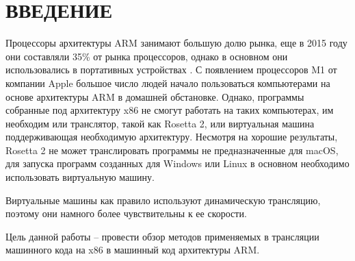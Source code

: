 \section*{ВВЕДЕНИЕ}

Процессоры архитектуры ARM занимают большую долю рынка, еще в 2015 году они составляли 35\% от рынка процессоров, однако в основном они использовались в портативных устройствах \cite{arm_report}.  С появлением процессоров M1 от компании Apple большое число людей начало пользоваться компьютерами на основе архитектуры ARM в домашней обстановке. Однако, программы собранные под архитектуру x86 не смогут работать на таких компьютерах, им необходим или транслятор, такой как Rosetta 2, или виртуальная машина поддерживающая необходимую архитектуру. Несмотря на хорошие результаты, Rosetta 2 не может транслировать программы не предназначенные для macOS, для запуска программ созданных для Windows или Linux в основном необходимо использовать виртуальную машину.

Виртуальные машины как правило используют динамическую трансляцию, поэтому они намного более чувствительны к ее скорости.

Цель данной работы – провести обзор методов применяемых в трансляции машинного кода на x86 в машинный код архитектуры ARM.

\pagebreak